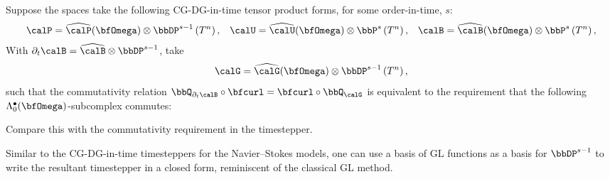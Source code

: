     \line

    \begin{example}
        Suppose the spaces take the following CG-DG-in-time tensor product forms, for some order-in-time, $s$:
        \begin{align}
            \calP  =  \widehat{\calP}(\bfOmega)\otimes\bbDP^{s - 1}\left(T^{n}\right),  &&
            \calU  =  \widehat{\calU}(\bfOmega)\otimes\bbP^{s}\left(T^{n}\right),  &&
            \calB  =  \widehat{\calB}(\bfOmega)\otimes\bbP^{s}\left(T^{n}\right),
        \end{align}
        With $\partial_{t}\calB = \widehat{\calB}\otimes\bbDP^{s - 1}$, take
        \begin{equation}
            \calG  =  \widehat{\calG}(\bfOmega)\otimes\bbDP^{s - 1}\left(T^{n}\right),
        \end{equation}
        such that the commutativity relation $\bbQ_{\partial_{t}\calB}\circ\bfcurl = \bfcurl\circ\bbQ_{\calG}$ is equivalent to the requirement that the following $\Lambda_{0}^{\bullet}(\bfOmega)$-subcomplex commutes:
        \begin{center}\end{center}
        Compare this with the commutativity requirement in the \cite{Laakmann_Hu_Farrell_2022} timestepper.

        Similar to the CG-DG-in-time timesteppers for the Navier--Stokes models, one can use a basis of GL functions as a basis for $\bbDP^{s - 1}$ to write the resultant timestepper in a closed form, reminiscent of the classical GL method.


\end{example}
